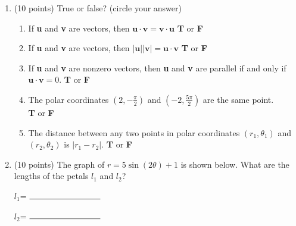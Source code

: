 \documentclass[11pt]{article}
\begin{document}
\begin{enumerate}
\newpage

\item (10 points) True or false? (circle your answer)
\begin{enumerate}[itemsep=15pt, label={\alph*)}]
\item If \textbf{u} and \textbf{v} are vectors, then $\textbf{u} \cdot \textbf{v} =  \textbf{v} \cdot \textbf{u}$ \null\hfill \textbf{T} or \textbf{F}
\item If \textbf{u} and \textbf{v} are vectors, then $|\textbf{u}| |\textbf{v}| =  \textbf{u} \cdot \textbf{v}$  \null\hfill \textbf{T} or \textbf{F}
\item If \textbf{u} and \textbf{v} are nonzero vectors, then \textbf{u} and \textbf{v} are parallel if and only if $\textbf{u} \cdot \textbf{v} = 0$.  \null\hfill \textbf{T} or \textbf{F}
\item The polar coordinates $(2, -\frac{\pi}{2})$ and $(-2, \frac{5\pi}{2})$ are the same point. \\ \null\hfill \textbf{T} or \textbf{F}
\item The distance between any two points in polar coordinates $(r_1, \theta_1)$ and $(r_2, \theta_2)$ is $|r_1 - r_2|$. \null\hfill \textbf{T} or \textbf{F}
\end{enumerate}

\vspace{20pt}

\item (10 points) The graph of $r = 5\sin(2\theta) + 1$ is shown below. What are the lengths of the petals $l_1$ and $l_2$?

\begin{center}
\end{center}

\vspace{50pt}

\begin{flushright}
$l_1$= $\rule{3cm}{0.4pt}$
\end{flushright}

\begin{flushright}
$l_2$= $\rule{3cm}{0.4pt}$
\end{flushright}

\end{enumerate}
\end{document}
